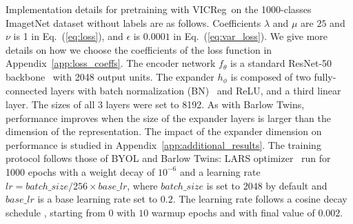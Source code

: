 \documentclass{article} %
\newcommand{\algo}{VICReg}
\begin{document}
    
    
    
    


Implementation details for pretraining with \algo \ on the 1000-classes ImagetNet dataset without labels are as follows. Coefficients $\lambda$ and $\mu$ are $25$ and $\nu$ is 1 in Eq.~(\ref{eq:loss}), and $\epsilon$ is $0.0001$ in Eq.~(\ref{eq:var_loss}). We give more details on how we choose the coefficients of the loss function in Appendix~\ref{app:loss_coeffs}. The encoder network $f_{\theta}$ is a standard ResNet-50 backbone~\cite{he2016resnet} with 2048 output units. The expander $h_{\phi}$ is composed of two fully-connected layers with batch normalization (BN)~\cite{ioffe2015bn} and ReLU, and a third linear layer. The sizes of all 3 layers were set to 8192. As with Barlow Twins, performance improves when the size of the expander layers is larger than the dimension of the representation. The impact of the expander dimension on performance is studied in Appendix~\ref{app:additional_results}. The training protocol follows those of BYOL and Barlow Twins: LARS optimizer~\cite{you2017lars, goyal2017lars} run for 1000 epochs with a weight decay of $10^{-6}$ and a learning rate $lr = batch\_size / 256 \times base\_lr$, where $batch\_size$ is set to $2048$ by default and $base\_lr$ is a base learning rate set to $0.2$. The learning rate follows a cosine decay schedule \cite{loshchilov2017sgdr}, starting from $0$ with $10$ warmup epochs and with final value of $0.002$.
\end{document}
